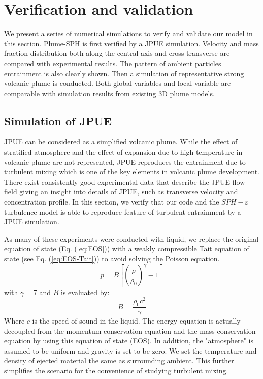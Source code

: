 \documentclass[journal abbreviation, manuscript]{copernicus}
\begin{document}
\section{Verification and validation} \label{sec:verification-validation}
We present a series of numerical simulations to verify and validate our model in this section. Plume-SPH is first verified by a JPUE simulation. Velocity and mass fraction distribution both along the central axis and cross transverse are compared with experimental results. The pattern of ambient particles entrainment is also clearly shown. Then a simulation of representative strong volcanic plume is conducted. Both global variables and local variable are comparable with simulation results from existing 3D plume models.

\subsection{Simulation of JPUE}
JPUE can be considered as a simplified volcanic plume. While the effect of stratified atmosphere and the effect of expansion due to high temperature in volcanic plume are not represented, JPUE reproduces the entrainment due to turbulent mixing which is one of the key elements in volcanic plume development. There exist consistently good experimental data \citep { list1982turbulent,dimotakis1983structure, papanicolaou1988investigations} that describe the JPUE flow field giving an insight into details of JPUE, such as transverse velocity and concentration profile. In this section, we verify that our code and the $SPH-\varepsilon$ turbulence model is able to reproduce feature of turbulent entrainment by a JPUE simulation.

As many of these experiments were conducted with liquid, we replace the original equation of state (Eq. (\ref{eq:EOS})) with a weakly compressible Tait equation of state \citep {becker2007weakly} (see Eq. (\ref{eq:EOS-Tait})) to avoid solving the Poisson equation.
\begin{equation}
p=B\left[\left(\dfrac{\rho}{\rho_0}\right)^{\gamma}-1\right]
\label{eq:EOS-Tait}
\end{equation}
with $\gamma=7$ and $B$ is evaluated by:
\begin{equation}
B=\dfrac{\rho_0 c^2}{\gamma}
\end{equation}
Where $c$ is the speed of sound in the liquid. The energy equation is actually decoupled from the momentum conservation equation and the mass conservation equation by using this equation of state (EOS). In addition, the "atmosphere" is assumed to be uniform and gravity is set to be zero. We set the temperature and density of ejected material the same as surrounding ambient. This further simplifies the scenario for the convenience of studying turbulent mixing. 
\end{document}
